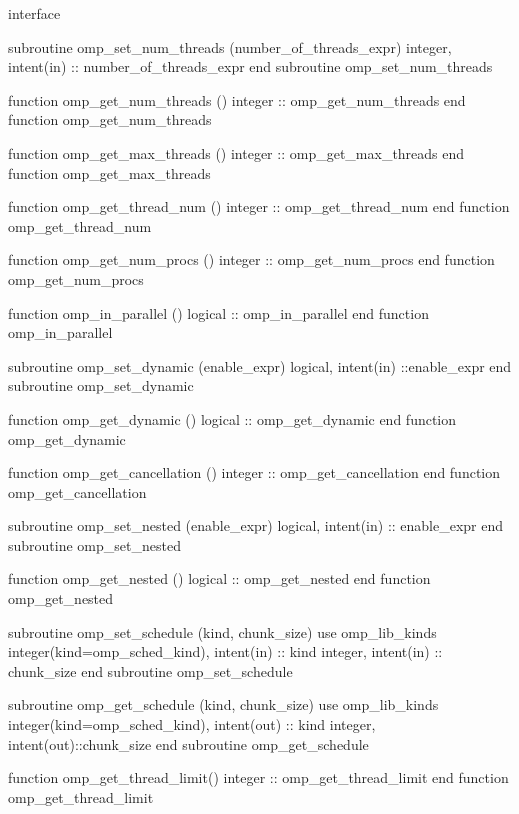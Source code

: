 {\begin{codepar}
         interface

          subroutine omp\_set\_num\_threads (number\_of\_threads\_expr)
           integer, intent(in) :: number\_of\_threads\_expr
          end subroutine omp\_set\_num\_threads

          function omp\_get\_num\_threads ()
           integer :: omp\_get\_num\_threads
          end function omp\_get\_num\_threads

          function omp\_get\_max\_threads ()
           integer :: omp\_get\_max\_threads
          end function omp\_get\_max\_threads

          function omp\_get\_thread\_num ()
           integer :: omp\_get\_thread\_num
          end function omp\_get\_thread\_num

          function omp\_get\_num\_procs ()
           integer :: omp\_get\_num\_procs
          end function omp\_get\_num\_procs

          function omp\_in\_parallel ()
           logical :: omp\_in\_parallel
          end function omp\_in\_parallel

          subroutine omp\_set\_dynamic (enable\_expr)
           logical, intent(in) ::enable\_expr
          end subroutine omp\_set\_dynamic

          function omp\_get\_dynamic ()
           logical :: omp\_get\_dynamic
          end function omp\_get\_dynamic

          function omp\_get\_cancellation ()
           integer :: omp\_get\_cancellation
          end function omp\_get\_cancellation

          subroutine omp\_set\_nested (enable\_expr)
           logical, intent(in) :: enable\_expr
          end subroutine omp\_set\_nested

          function omp\_get\_nested ()
           logical :: omp\_get\_nested
          end function omp\_get\_nested

          subroutine omp\_set\_schedule (kind, chunk\_size)
           use omp\_lib\_kinds
           integer(kind=omp\_sched\_kind), intent(in) :: kind
           integer, intent(in) :: chunk\_size
          end subroutine omp\_set\_schedule

          subroutine omp\_get\_schedule (kind, chunk\_size)
           use omp\_lib\_kinds
           integer(kind=omp\_sched\_kind), intent(out) :: kind
           integer, intent(out)::chunk\_size
          end subroutine omp\_get\_schedule

          function omp\_get\_thread\_limit()
           integer :: omp\_get\_thread\_limit
          end function omp\_get\_thread\_limit


\end{codepar}}
